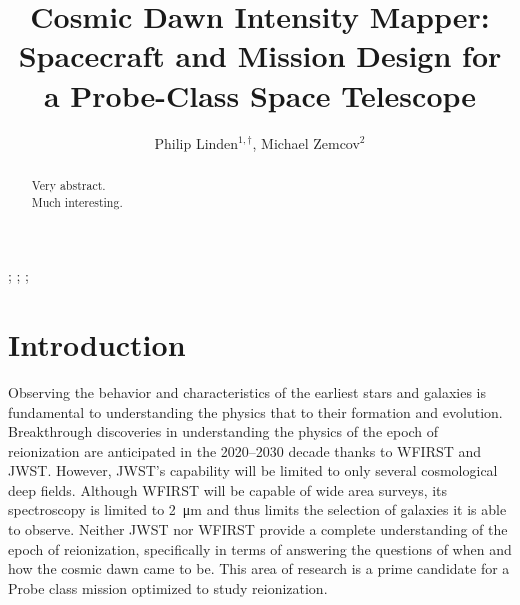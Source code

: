 \documentclass{ws-jai}
\begin{document}
\catchline{}{}{}{}{} %


\title{Cosmic Dawn Intensity Mapper: \\Spacecraft and Mission Design for a Probe-Class Space Telescope}

\author{Philip Linden$^{1,\dagger}$, Michael Zemcov$^{2}$}

\address{
$^1$Department of Mechanical Engineering, Kate Gleason College of Engineering, Rochester
Institute of Technology, Rochester, NY 14623, USA, pjl7651@rit.edu\\
$^1$Center for Detectors, School of Physics and Astronomy, Rochester
Institute of Technology, Rochester, NY 14623, USA, zemcov@cfd.rit.edu\\
}

\maketitle


\begin{history}
;
;
;
\end{history}

\begin{abstract}
  Very abstract.\\
  Much interesting.
\end{abstract}


\section{Introduction}
\label{S:introduction}
Observing the behavior and characteristics of the earliest stars and galaxies is fundamental to understanding the physics that to their formation and evolution.
Breakthrough discoveries in understanding the physics of the epoch of reionization are anticipated in the 2020--2030 decade thanks to WFIRST and JWST\@.
However, JWST's capability will be limited to only several cosmological deep fields.
Although WFIRST will be capable of wide area surveys, its spectroscopy is limited to \SI{2}{\micro\meter} and thus limits the selection of galaxies it is able to observe.
Neither JWST nor WFIRST provide a complete understanding of the epoch of reionization, specifically in terms of answering the questions of when and how the cosmic dawn came to be.
This area of research is a prime candidate for a Probe class mission optimized to study reionization.
\end{document}
